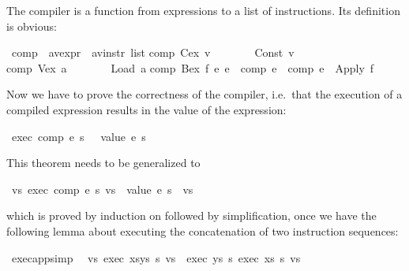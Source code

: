 \begin{isabellebody}
\begin{isamarkuptext}
The compiler is a function from expressions to a list of instructions. Its
definition is obvious:%
\end{isamarkuptext}%
\ comp\ {\isacharcolon}{\isacharcolon}\ {\isachardoublequote}{\isacharparenleft}{\isacharprime}a{\isacharcomma}{\isacharprime}v{\isacharparenright}expr\ {\isasymRightarrow}\ {\isacharparenleft}{\isacharprime}a{\isacharcomma}{\isacharprime}v{\isacharparenright}instr\ list{\isachardoublequote}\isanewline
{}\isanewline
{\isachardoublequote}comp\ {\isacharparenleft}Cex\ v{\isacharparenright}\ \ \ \ \ \ \ {\isacharequal}\ {\isacharbrackleft}Const\ v{\isacharbrackright}{\isachardoublequote}\isanewline
{\isachardoublequote}comp\ {\isacharparenleft}Vex\ a{\isacharparenright}\ \ \ \ \ \ \ {\isacharequal}\ {\isacharbrackleft}Load\ a{\isacharbrackright}{\isachardoublequote}\isanewline
{\isachardoublequote}comp\ {\isacharparenleft}Bex\ f\ e{}\ e{}{\isacharparenright}\ {\isacharequal}\ {\isacharparenleft}comp\ e{}{\isacharparenright}\ {\isacharat}\ {\isacharparenleft}comp\ e{}{\isacharparenright}\ {\isacharat}\ {\isacharbrackleft}Apply\ f{\isacharbrackright}{\isachardoublequote}%
\begin{isamarkuptext}%
Now we have to prove the correctness of the compiler, i.e.\ that the
execution of a compiled expression results in the value of the expression:%
\end{isamarkuptext}%
\ {\isachardoublequote}exec\ {\isacharparenleft}comp\ e{\isacharparenright}\ s\ {\isacharbrackleft}{\isacharbrackright}\ {\isacharequal}\ {\isacharbrackleft}value\ e\ s{\isacharbrackright}{\isachardoublequote}%
\begin{isamarkuptext}%
\noindent
This theorem needs to be generalized to%
\end{isamarkuptext}%
\ {\isachardoublequote}{\isasymforall}vs{\isachardot}\ exec\ {\isacharparenleft}comp\ e{\isacharparenright}\ s\ vs\ {\isacharequal}\ {\isacharparenleft}value\ e\ s{\isacharparenright}\ {\isacharhash}\ vs{\isachardoublequote}%
\begin{isamarkuptxt}%
\noindent
which is proved by induction on  followed by simplification, once
we have the following lemma about executing the concatenation of two
instruction sequences:%
\end{isamarkuptxt}%
\ exec{\isacharunderscore}app{\isacharbrackleft}simp{\isacharbrackright}{\isacharcolon}\isanewline
\ \ {\isachardoublequote}{\isasymforall}vs{\isachardot}\ exec\ {\isacharparenleft}xs{\isacharat}ys{\isacharparenright}\ s\ vs\ {\isacharequal}\ exec\ ys\ s\ {\isacharparenleft}exec\ xs\ s\ vs{\isacharparenright}{\isachardoublequote}%

\end{isabellebody}
